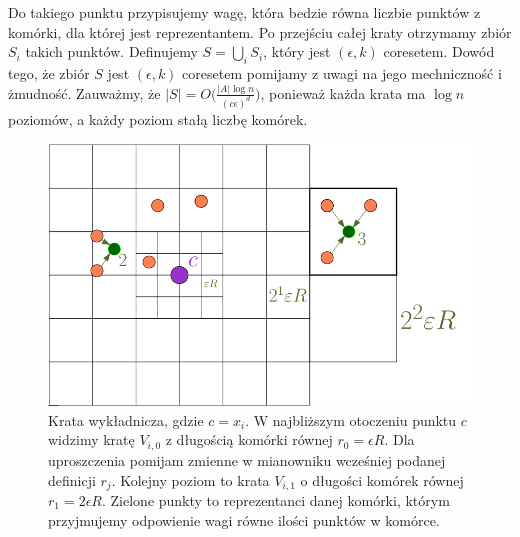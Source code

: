 Do takiego punktu przypisujemy wagę, która bedzie równa liczbie punktów z komórki, dla której jest reprezentantem.
Po przejściu całej kraty otrzymamy zbiór $S_{i}$ takich punktów.
Definujemy $S = \bigcup_{i} S_{i}$, który jest  $(\epsilon, k)$ coresetem.
Dowód tego, że zbiór $S$ jest $(\epsilon, k)$ coresetem pomijamy z uwagi na jego mechniczność i żmudność.
Zauważmy, że $|S| = O\Big( \frac{|A| \log n }{ (c\epsilon)^{d} } \Big)$, ponieważ każda krata ma $\log n$ poziomów, a każdy poziom stałą liczbę komórek.
\begin{figure}[H]
    \centering
    \includegraphics[totalheight=4cm]{grid.png}
    \caption{Krata wykładnicza, gdzie $c = x_{i}$. W najbliższym otoczeniu punktu $c$ widzimy kratę $V_{i,0}$ z długością komórki równej $r_{0} = \epsilon R$.
    Dla uproszczenia pomijam zmienne w mianowniku wcześniej podanej definicji $r_{j}$.
    Kolejny poziom to krata $V_{i,1}$ o długości komórek równej $r_{1} = 2 \epsilon R$.
    Zielone punkty to reprezentanci danej komórki, którym przyjmujemy odpowienie wagi równe ilości punktów w komórce. 
    }
\end{figure}
